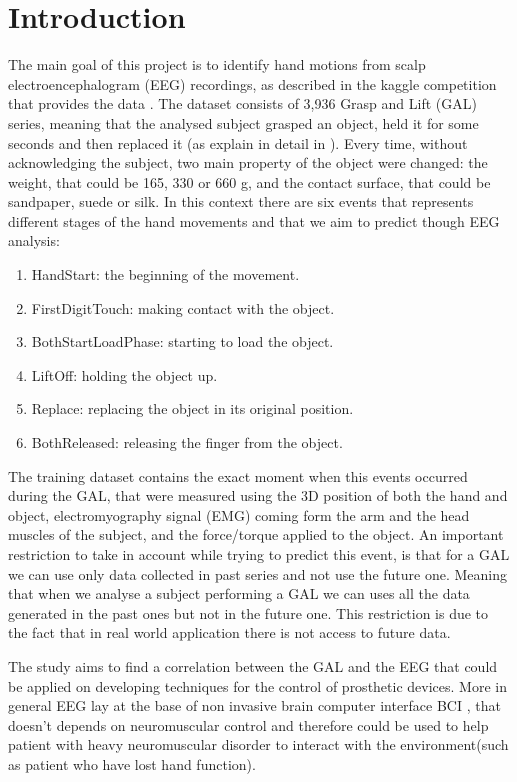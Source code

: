 \documentclass[final,leqno,onefignum,onetabnum]{siamltexmm}
\begin{document}
\section{Introduction}
The main goal of this project  is to identify hand motions from scalp electroencephalogram (EEG) recordings, as described in the kaggle competition that provides the data \cite{kaggle}. The dataset consists of 3,936 Grasp and Lift (GAL) series, meaning that the analysed subject grasped an object, held it for some seconds and then replaced it (as explain in detail in \cite{experiment}). Every time, without acknowledging the subject,  two main property  of the object were changed: the  weight, that could be 165, 330 or 660 g, and the contact surface, that could be sandpaper, suede or silk. In this context there are six events that represents different stages of the hand movements and that we aim to predict though EEG analysis: 
\begin{enumerate} 
\item HandStart: the beginning of the movement.
\item FirstDigitTouch: making contact with the object.  
\item BothStartLoadPhase: starting to load the object. 
\item LiftOff: holding the object up.
\item Replace: replacing the object in its original position.
\item BothReleased: releasing the finger from the object. 
\end{enumerate}
The training dataset contains the exact moment when this events occurred during the GAL, that were measured using the 3D position of both the hand and object, electromyography signal (EMG) coming form the arm and the head muscles of the subject, and the force/torque applied to the object. An important restriction to take in account while trying to predict this event, is that for a GAL we can use only data collected in past series and not use the future one. Meaning that when we analyse a subject performing  a GAL we can uses all the data generated in the past ones but not in the future one. This restriction is due to the fact that in real world application there is not access to future data.


The study aims to find a correlation between the GAL and the EEG  that could be applied on developing techniques for the control of prosthetic devices. More in general EEG lay at the base of non invasive brain computer interface BCI \cite{BCI}, that doesn't depends on neuromuscular control and therefore could be used to help patient with heavy neuromuscular disorder to interact with the environment(such as patient who have lost hand function). 
\end{document}
